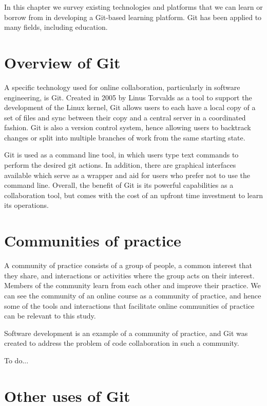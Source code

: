 \documentclass[12pt,twoside,vi]{mitthesis}
\newcommand{\wip}[1]{{\color{red} To do...}}
\begin{document}
In this chapter we survey existing technologies and platforms that we can learn or borrow from in developing a Git-based learning platform. Git has been applied to many fields, including education. 

\section{Overview of Git}

A specific technology used for online collaboration, particularly in software engineering, is Git. Created in 2005 by Linus Torvalds as a tool to support the development of the Linux kernel, Git allows users to each have a local copy of a set of files and sync between their copy and a central server in a coordinated fashion. Git is also a version control system, hence allowing users to backtrack changes or split into multiple branches of work from the same starting state.

Git is used as a command line tool, in which users type text commands to perform the desired git actions. In addition, there are graphical interfaces available which serve as a wrapper and aid for users who prefer not to use the command line. Overall, the benefit of Git is its powerful capabilities as a collaboration tool, but comes with the cost of an upfront time investment to learn its operations.~\cite{githistory}

\section{Communities of practice}

A community of practice consists of a group of people, a common interest that they share, and interactions or activities where the group acts on their interest. Members of the community learn from each other and improve their practice. We can see the community of an online course as a community of practice, and hence some of the tools and interactions that facilitate online communities of practice can be relevant to this study.~\cite{teachingdigital}

Software development is an example of a community of practice, and Git was created to address the problem of code collaboration in such a community. 

\wip{Use of group chats such as gitter and mattermost to complement projects}

\section{Other uses of Git}
\end{document}
